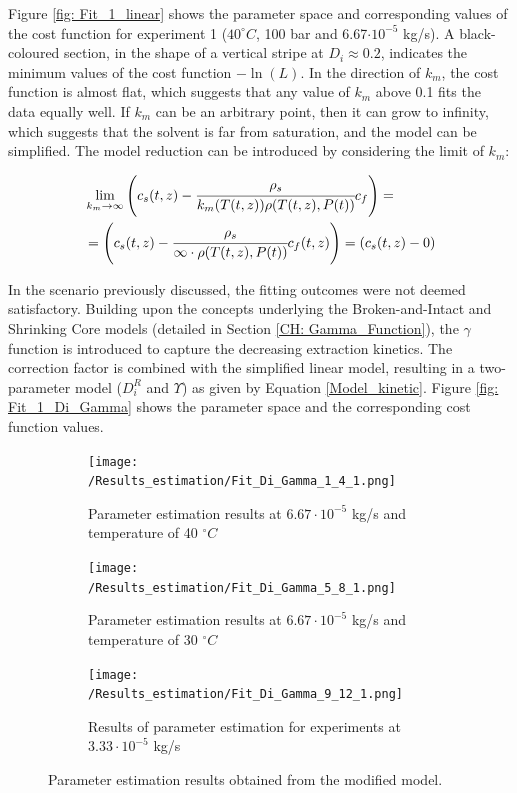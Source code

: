 \documentclass[a4paper,fleqn]{cas-dc}
\begin{document}
Figure \ref{fig: Fit_1_linear} shows the parameter space and corresponding values of the cost function for experiment 1 ($40^\circ C$, 100 bar and 6.67$\cdot 10^{-5}$ kg/s). A black-coloured section, in the shape of a vertical stripe at $D_i \approx 0.2$, indicates the minimum values of the cost function $-\ln(L)$. In the direction of $k_m$, the cost function is almost flat, which suggests that any value of $k_m$ above 0.1 fits the data equally well. If $k_m$ can be an arbitrary point, then it can grow to infinity, which suggests that the solvent is far from saturation, and the model can be simplified. The model reduction can be introduced by considering the limit of $k_m$:

{\footnotesize
	\begin{equation*}
		\begin{split}
			&\lim_{k_m \rightarrow \infty} \left({\color{black}{\color{black} c_s} }(t,z)  - \cfrac{{\color{black}\rho_s}}{{\color{black}k_m}(T(t,z)){\color{black}\rho}(T(t,z),{\color{black}P}(t))}  c_f \right)  = \\
			&= \left({\color{black}{\color{black} c_s} }(t,z)  - \cfrac{\rho_s}{\infty \cdot \rho(T(t,z),P(t))}  {c_f}(t,z) \right) = \left(c_s(t,z) - 0 \right)
		\end{split}
\end{equation*} }

In the scenario previously discussed, the fitting outcomes were not deemed satisfactory. Building upon the concepts underlying the Broken-and-Intact and Shrinking Core models (detailed in Section \ref{CH: Gamma_Function}), the $\gamma$ function is introduced to capture the decreasing extraction kinetics. The correction factor is combined with the simplified linear model, resulting in a two-parameter model ($D_i^R$ and $\Upsilon$) as given by Equation \ref{Model_kinetic}. Figure \ref{fig: Fit_1_Di_Gamma} shows the parameter space and the corresponding cost function values.

\begin{figure}[!h]
	\centering
	\begin{subfigure}{0.9\columnwidth}
		\centering
		\texttt{[image: /Results\_estimation/Fit\_Di\_Gamma\_1\_4\_1.png]}
		\caption{Parameter estimation results at $6.67\cdot 10^{-5}$ kg/s and temperature of 40 $^\circ C$}
		\label{fig: Fit_1_4_Di_Gamma}
	\end{subfigure}
	\hfill
	\begin{subfigure}{0.9\columnwidth}
		\centering
		\texttt{[image: /Results\_estimation/Fit\_Di\_Gamma\_5\_8\_1.png]}
		\caption{Parameter estimation results at $6.67\cdot 10^{-5}$ kg/s and temperature of 30 $^\circ C$}
		\label{fig: Fit_5_8_Di_Gamma}
	\end{subfigure}
	\hfill
	\begin{subfigure}{0.9\columnwidth}
		\centering
		\texttt{[image: /Results\_estimation/Fit\_Di\_Gamma\_9\_12\_1.png]}
		\caption{Results of parameter estimation for experiments at $3.33\cdot 10^{-5}$ kg/s}
		\label{fig: Fit_9_12_Di_Gamma}
	\end{subfigure}
	\caption{Parameter estimation results obtained from the modified model.}
	\label{fig: Fit_Di_Gamma}
\end{figure}
\end{document}
